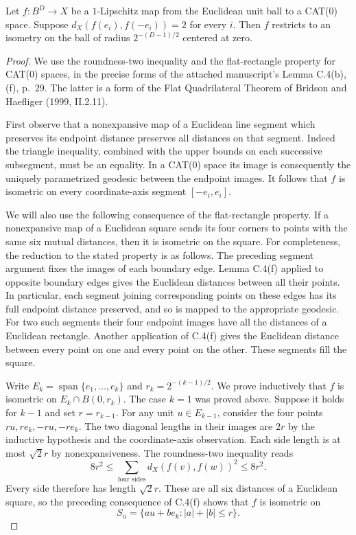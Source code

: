 \begin{lemma}
\label{lem:rigid-ball}
Let $f:B^D\longrightarrow X$ be a $1$-Lipschitz map from the Euclidean
unit ball to a CAT(0) space.  Suppose
$d_X(f(e_i),f(-e_i))=2$ for every $i$.  Then $f$ restricts to an isometry
on the ball of radius $2^{-(D-1)/2}$ centered at zero.
\end{lemma}
\begin{proof}
We use the roundness-two inequality and the flat-rectangle property for
CAT(0) spaces, in the precise forms of the attached manuscript's
Lemma C.4(b),(f), p.~29.  The latter is a form of the Flat Quadrilateral
Theorem of Bridson and Haefliger (1999, II.2.11).

First observe that a nonexpansive map of a Euclidean line segment which
preserves its endpoint distance preserves all distances on that segment.
Indeed the triangle inequality, combined with the upper bounds on each
successive subsegment, must be an equality.  In a CAT(0) space its image
is consequently the uniquely parametrized geodesic between the endpoint
images.  It follows that $f$ is isometric on every coordinate-axis
segment $[-e_i,e_i]$.

We will also use the following consequence of the flat-rectangle
property.  If a nonexpansive map of a Euclidean square sends its four
corners to points with the same six mutual distances, then it is
isometric on the square.  For completeness, the reduction to the stated
property is as follows.  The preceding segment argument fixes the
images of each boundary edge.  Lemma C.4(f) applied to opposite boundary
edges gives the Euclidean distances between all their points.  In
particular, each segment joining corresponding points on these edges
has its full endpoint distance preserved, and so is mapped to the
appropriate geodesic.  For two such segments their four endpoint images
have all the distances of a Euclidean rectangle.  Another application
of C.4(f) gives the Euclidean distance between every point on one and
every point on the other.  These segments fill the square.

Write $E_k=\operatorname{span}\{e_1,\ldots,e_k\}$ and
$r_k=2^{-(k-1)/2}$.  We prove inductively that $f$ is isometric on
$E_k\cap B(0,r_k)$.  The case $k=1$ was proved above.  Suppose it holds
for $k-1$ and set $r=r_{k-1}$.  For any unit $u\in E_{k-1}$, consider
the four points $ru,re_k,-ru,-re_k$.  The two diagonal lengths in their
images are $2r$ by the inductive hypothesis and the coordinate-axis
observation.  Each side length is at most $\sqrt2r$ by nonexpansiveness.
The roundness-two inequality reads
\[
 8r^2\le\sum_{\text{four sides}}d_X(f(v),f(w))^2\le8r^2.
\]
Every side therefore has length $\sqrt2r$.  These are all six distances
of a Euclidean square, so the preceding consequence of C.4(f) shows
that $f$ is isometric on
\[
 S_u=\{a u+b e_k:|a|+|b|\le r\}.
\]


\end{proof}
